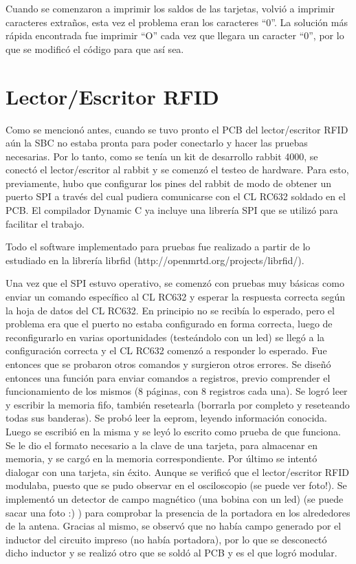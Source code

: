 Cuando se comenzaron a imprimir los saldos de las tarjetas, volvió a imprimir caracteres extraños, esta vez el problema eran los caracteres “0”. La solución más rápida encontrada fue imprimir “O” cada vez que llegara un caracter “0”, 
por lo que se modificó el código para que así sea.


\section{Lector/Escritor RFID}
Como se mencionó antes, cuando se tuvo pronto el PCB del lector/escritor RFID aún la SBC no estaba pronta para poder conectarlo y hacer las pruebas necesarias. Por lo tanto, como se tenía un kit de desarrollo rabbit 4000, se conectó el lector/escritor al rabbit y se comenzó el testeo de hardware. Para esto, previamente, hubo que configurar los pines del rabbit de modo de obtener un puerto SPI a través del cual pudiera comunicarse con el CL RC632 soldado en el PCB. El compilador Dynamic C ya incluye una librería SPI que se utilizó para facilitar el trabajo.

Todo el software implementado para pruebas fue realizado a partir de lo estudiado en la librería 
librfid (http://openmrtd.org/projects/librfid/).

Una vez que el SPI estuvo operativo, se comenzó con pruebas muy básicas como enviar un comando específico al CL RC632 y esperar la respuesta correcta según la hoja de datos del CL RC632. En principio no se recibía lo esperado, pero el problema era que el puerto no estaba configurado en forma correcta, luego de reconfigurarlo en varias oportunidades (testeándolo con un led) se llegó a la configuración correcta y el CL RC632 comenzó a responder lo esperado. Fue entonces que se probaron otros comandos y surgieron otros errores. Se diseñó entonces una función para enviar comandos a registros, previo comprender el funcionamiento de los mismos (8 páginas, con 8 registros cada una). 
Se logró leer y escribir la memoria fifo, también resetearla (borrarla por completo y reseteando todas sus banderas). Se probó leer la eeprom, leyendo información conocida. Luego se escribió en la misma y se leyó lo escrito como prueba de que funciona. 
Se le dio el formato necesario a la clave de una tarjeta, para almacenar en memoria, y se cargó en la memoria correspondiente. 
Por último se intentó dialogar con una tarjeta, sin éxito. Aunque se verificó que el lector/escritor RFID modulaba, puesto que se pudo observar en el osciloscopio (se puede ver foto!). 
Se implementó un detector de campo magnético (una bobina con un led) (se puede sacar una foto :) ) para comprobar la presencia de la portadora en los alrededores de la antena. Gracias al mismo, se observó que no había campo generado por el inductor del circuito impreso (no había portadora), por lo que se desconectó dicho inductor y se realizó otro que se soldó al PCB y es el que logró modular.

